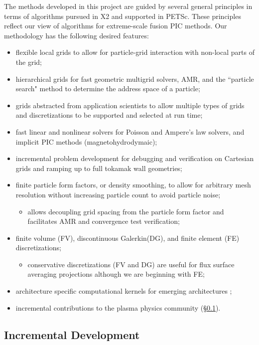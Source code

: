 \documentclass[review]{siamart}
\begin{document}
The methods developed in this project are guided by several general principles in terms of algorithms pursued in X2 and supported in PETSc.
These principles reflect our view of algorithms for extreme-scale fusion PIC methods.
Our methodology has the following desired features:
\begin{itemize}
\item flexible local grids to allow for particle-grid interaction with non-local parts of the grid;
\item hierarchical grids for fast geometric multigrid solvers, AMR, and the ``particle search" method to determine the address space of a particle;
\item grids abstracted from application scientists to allow multiple types of grids and discretizations to be supported and selected at run time;
\item fast linear and nonlinear solvers for Poisson and Ampere's law solvers, and implicit PIC methods (magnetohydrodymaic);
\item incremental problem development for debugging and verification on Cartesian grids and ramping up to full tokamak wall geometries;
\item finite particle form factors, or density smoothing, to allow for arbitrary mesh resolution without increasing particle count to avoid particle noise;
\begin{itemize}
\item allows decoupling grid spacing from the particle form factor and facilitates AMR and convergence test verification;
\end{itemize}
\item finite volume (FV), discontinuous Galerkin(DG), and finite element (FE) discretizations;
\begin{itemize}
\item conservative discretizations (FV and DG) are useful for flux surface averaging projections although we are beginning with FE;
\end{itemize}
\item architecture specific computational kernels for emerging architectures \cite{KnepleyBrownMcInnesSmithRuppAdams2015};
\item incremental contributions to the plasma physics community (\S\ref{sec:id}).
\end{itemize}

\subsection{Incremental Development}
\label{sec:id}
\end{document}
